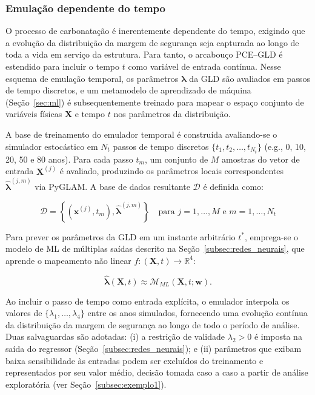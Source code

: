 \subsubsection{Emula\c{c}\~ao dependente do tempo}
\label{subsub:temporal}

O processo de carbonatação é inerentemente dependente do tempo, exigindo que a evolução da distribuição da margem de segurança seja capturada ao longo de toda a vida em serviço da estrutura. Para tanto, o arcabouço PCE--GLD é estendido para incluir o tempo $t$ como variável de entrada contínua. Nesse esquema de emulação temporal, os parâmetros $\boldsymbol{\lambda}$ da GLD são avaliados em passos de tempo discretos, e um metamodelo de aprendizado de máquina (Seção~\ref{sec:ml}) é subsequentemente treinado para mapear o espaço conjunto de variáveis físicas $\mathbf{X}$ e tempo $t$ nos parâmetros da distribuição.

A base de treinamento do emulador temporal é construída avaliando-se o simulador estocástico em $N_t$ passos de tempo discretos $\{t_1, t_2, \dots, t_{N_t}\}$ (e.g., 0, 10, 20, 50 e 80 anos). Para cada passo $t_m$, um conjunto de $M$ amostras do vetor de entrada $\mathbf{X}^{(j)}$ é avaliado, produzindo os parâmetros locais correspondentes $\hat{\boldsymbol{\lambda}}^{(j, m)}$ via PyGLAM. A base de dados resultante $\mathcal{D}$ é definida como:

\begin{equation}
\mathcal{D} = \left\{ \left( \mathbf{x}^{(j)}, t_m \right), \hat{\boldsymbol{\lambda}}^{(j, m)} \right\} \quad \text{para } j=1,\dots,M \text{ e } m=1,\dots,N_t
\label{eq:dataset_temporal}
\end{equation}

Para prever os parâmetros da GLD em um instante arbitrário $t^*$, emprega-se o modelo de ML de múltiplas saídas descrito na Seção~\ref{subsec:redes_neurais}, que aprende o mapeamento não linear $f: (\mathbf{X}, t) \to \mathbb{R}^4$:

\begin{equation}
\hat{\boldsymbol{\lambda}}(\mathbf{X}, t) \approx \mathcal{M}_{ML}(\mathbf{X}, t; \mathbf{w}).
\label{eq:ml_temporal}
\end{equation}

Ao incluir o passo de tempo como entrada explícita, o emulador interpola os valores de $\{\lambda_1, \dots, \lambda_4\}$ entre os anos simulados, fornecendo uma evolução contínua da distribuição da margem de segurança ao longo de todo o período de análise. Duas salvaguardas são adotadas: (i) a restrição de validade $\lambda_2 > 0$ é imposta na saída do regressor (Seção~\ref{subsec:redes_neurais}); e (ii) parâmetros que exibam baixa sensibilidade às entradas podem ser excluídos do treinamento e representados por seu valor médio, decisão tomada caso a caso a partir de análise exploratória (ver Seção~\ref{subsec:exemplo1}).

